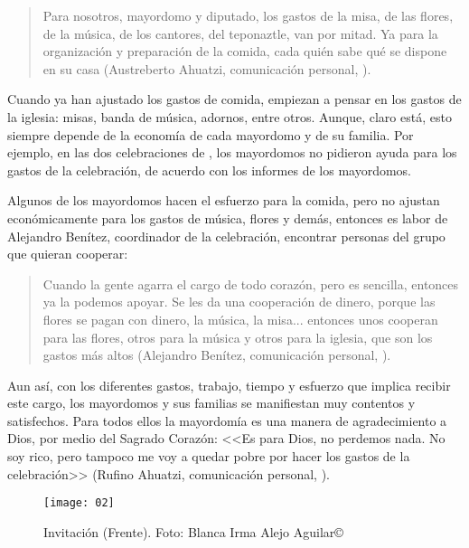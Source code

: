 \documentclass[14pt,letterpaper,twoside]{extbook} %
\begin{document}
\begin{quotation}
\noindent Para nosotros, mayordomo y diputado, los gastos de la misa, de las flores, de la música, de los cantores, del teponaztle, van por mitad. Ya para la organización y preparación de la comida, cada quién sabe qué se dispone en su casa (Austreberto Ahuatzi, comunicación personal, ).
\end{quotation}

\noindent Cuando ya han ajustado los gastos de comida, empiezan a pensar en los gastos de la iglesia: misas, banda de música, adornos, entre otros. Aunque, claro está, esto siempre depende de la economía de cada mayordomo y de su familia. Por ejemplo, en las dos celebraciones de , los mayordomos no pidieron ayuda para los gastos de la celebración, de acuerdo con los informes de los mayordomos.

Algunos de los mayordomos hacen el esfuerzo para la comida, pero no ajustan económicamente para los gastos de música, flores y demás, entonces es labor de Alejandro Benítez, coordinador de la celebración, encontrar personas del grupo que quieran cooperar:

\begin{quotation}
\noindent Cuando la gente agarra el cargo de todo corazón, pero es sencilla, entonces ya la podemos apoyar. Se les da una cooperación de dinero, porque las flores se pagan con dinero, la música, la misa... entonces unos cooperan para las flores, otros para la música y otros para la iglesia, que son los gastos más altos (Alejandro Benítez, comunicación personal, ).
\end{quotation}

\noindent Aun así, con los diferentes gastos, trabajo, tiempo y esfuerzo que implica recibir este cargo, los mayordomos y sus familias se manifiestan muy contentos y satisfechos. Para todos ellos la mayordomía es una manera de agradecimiento a Dios, por medio del Sagrado Corazón: <<Es para Dios, no perdemos nada. No soy rico, pero tampoco me voy a quedar pobre por hacer los gastos de la celebración>> (Rufino Ahuatzi, comunicación personal, ).


\begin{figure}
\centering
\texttt{[image: 02]}
\renewcommand{\figurename}{Imagen}
\caption[Invitación (Frente)]{Invitación (Frente). Foto: Blanca Irma Alejo Aguilar\thinspace\copyright}
\label{invitación_frente}
\end{figure}
\end{document}

